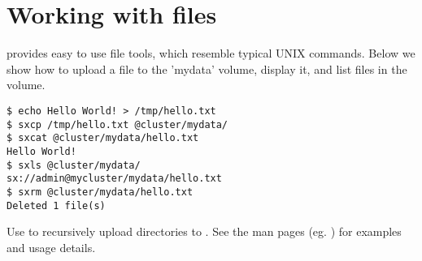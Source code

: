 \section*{Working with files}
\SX provides easy to use file tools, which resemble typical UNIX commands.
Below we show how to upload a file to the 'mydata' volume, display it,
and list files in the volume.

\small
\begin{lstlisting}
$ echo Hello World! > /tmp/hello.txt
$ sxcp /tmp/hello.txt @cluster/mydata/
$ sxcat @cluster/mydata/hello.txt
Hello World!
$ sxls @cluster/mydata/
sx://admin@mycluster/mydata/hello.txt
$ sxrm @cluster/mydata/hello.txt
Deleted 1 file(s)
\end{lstlisting}
\LARGE
Use  to recursively upload directories to \SX. See the man pages
(eg. ) for examples and usage details.
